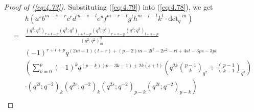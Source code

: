 \documentclass[table,a4paper,reqno]{amsart}
\numberwithin{equation}{section}
\theoremstyle{definition}
\begin{document}
\begin{proof}[Proof of (\ref{eq:4.73})]
    Substituting (\ref{eq:4.79}) into (\ref{eq:4.78}), we get
    \begin{equation}
        \begin{split}
            &h\left(a^sb^{m-s-r}c^rd^{m-s-l}e^{p}f^{m-r-t}g^lh^{m-l-t}k^t\cdot\text{det}_q^{-m}\right)\\
            =&\frac{(q^2;q^2)_{r+t-p}(q^2;q^2)_{l+t-p}(q^2;q^2)_{r+s-p}(q^2;q^2)_{l+s-p}}{(q^2;q^2)_m^2}\\
            &(-1)^{r+l+p}q^{(2m+1)(l+r)+(p-2)m-2l^2-2r^2-rl+4st-3ps-3pt}\\
            &\left(\sum_{k=0}^{p}(-1)^{k}q^{(p-k)(p-3k-1)+2k(s+t)}\left(q^{2k}{p-1\choose k}_{q^{2}}+{p-1\choose k-1}_{q^{2}}\right)\right.\\
            &\left.\cdot(q^{2l};q^{-2})_k(q^{2r};q^{-2})_k(q^{2s};q^{-2})_{p-k}(q^{2t};q^{-2})_{p-k}\right)\\

\end{split}
\end{equation}
\end{proof}
\end{document}

